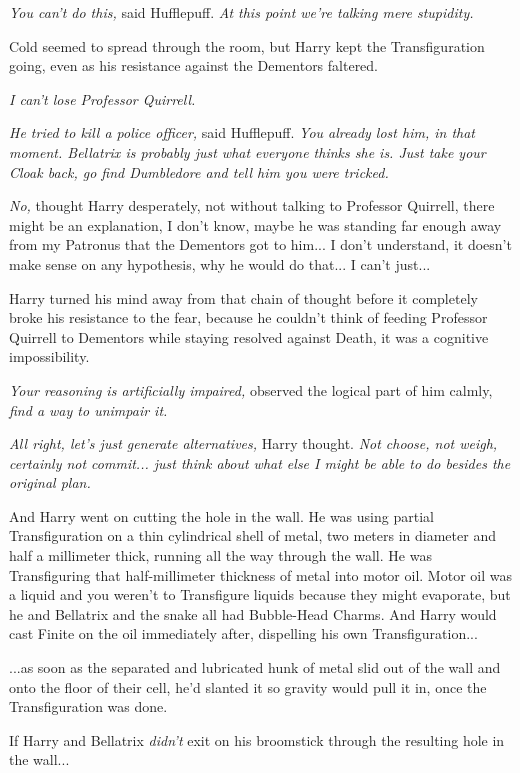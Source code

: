 \emph{You can't do this,} said Hufflepuff. \emph{At this point we're talking mere stupidity.}

Cold seemed to spread through the room, but Harry kept the Transfiguration going, even as his resistance against the Dementors faltered.

\emph{I can't lose Professor Quirrell.}

\emph{He tried to kill a police officer,} said Hufflepuff. \emph{You already lost him, in that moment. Bellatrix is probably just what everyone thinks she is. Just take your Cloak back, go find Dumbledore and tell him you were tricked.}

\emph{No,} thought Harry desperately, not without talking to Professor Quirrell, there might be an explanation, I don't know, maybe he was standing far enough away from my Patronus that the Dementors got to him... I don't understand, it doesn't make sense on any hypothesis, why he would do that... I can't just...

Harry turned his mind away from that chain of thought before it completely broke his resistance to the fear, because he couldn't think of feeding Professor Quirrell to Dementors while staying resolved against Death, it was a cognitive impossibility.

\emph{Your reasoning is artificially impaired,} observed the logical part of him calmly, \emph{find a way to unimpair it.}

\emph{All right, let's just generate alternatives,} Harry thought. \emph{Not choose, not weigh, certainly not commit... just think about what else I might be able to do besides the original plan.}

And Harry went on cutting the hole in the wall. He was using partial Transfiguration on a thin cylindrical shell of metal, two meters in diameter and half a millimeter thick, running all the way through the wall. He was Transfiguring that half-millimeter thickness of metal into motor oil. Motor oil was a liquid and you weren't to Transfigure liquids because they might evaporate, but he and Bellatrix and the snake all had Bubble-Head Charms. And Harry would cast Finite on the oil immediately after, dispelling his own Transfiguration...

...as soon as the separated and lubricated hunk of metal slid out of the wall and onto the floor of their cell, he'd slanted it so gravity would pull it in, once the Transfiguration was done.

If Harry and Bellatrix \emph{didn't} exit on his broomstick through the resulting hole in the wall...

